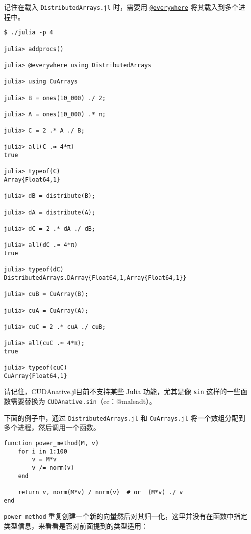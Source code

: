 记住在载入 \texttt{DistributedArrays.jl} 时，需要用 \hyperlink{4972064255482407966}{\texttt{@everywhere}} 将其载入到多个进程中。




\begin{verbatim}
$ ./julia -p 4

julia> addprocs()

julia> @everywhere using DistributedArrays

julia> using CuArrays

julia> B = ones(10_000) ./ 2;

julia> A = ones(10_000) .* π;

julia> C = 2 .* A ./ B;

julia> all(C .≈ 4*π)
true

julia> typeof(C)
Array{Float64,1}

julia> dB = distribute(B);

julia> dA = distribute(A);

julia> dC = 2 .* dA ./ dB;

julia> all(dC .≈ 4*π)
true

julia> typeof(dC)
DistributedArrays.DArray{Float64,1,Array{Float64,1}}

julia> cuB = CuArray(B);

julia> cuA = CuArray(A);

julia> cuC = 2 .* cuA ./ cuB;

julia> all(cuC .≈ 4*π);
true

julia> typeof(cuC)
CuArray{Float64,1}
\end{verbatim}



请记住，CUDAnative.jl\footnotemark[2] 目前不支持某些 Julia 功能，尤其是像 \texttt{sin} 这样的一些函数需要替换为 \texttt{CUDAnative.sin}（cc：@maleadt）。



下面的例子中，通过 \texttt{DistributedArrays.jl} 和 \texttt{CuArrays.jl} 将一个数组分配到多个进程，然后调用一个函数。




\begin{verbatim}
function power_method(M, v)
    for i in 1:100
        v = M*v
        v /= norm(v)
    end

    return v, norm(M*v) / norm(v)  # or  (M*v) ./ v
end
\end{verbatim}



\texttt{power\_method} 重复创建一个新的向量然后对其归一化，这里并没有在函数中指定类型信息，来看看是否对前面提到的类型适用：




